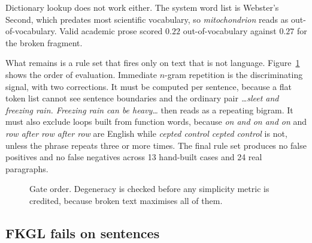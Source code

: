 \documentclass[twocolumn,10pt,a4paper]{article}
\begin{document}
Dictionary lookup does not work either. The system word list is Webster's Second,
which predates most scientific vocabulary, so \emph{mitochondrion} reads as
out-of-vocabulary. Valid academic prose scored $0.22$ out-of-vocabulary against
$0.27$ for the broken fragment.

What remains is a rule set that fires only on text that is not language.
Figure~\ref{fig:gate} shows the order of evaluation. Immediate $n$-gram
repetition is the discriminating signal, with two corrections. It must be
computed per sentence, because a flat token list cannot see sentence boundaries
and the ordinary pair \emph{\dots sleet and freezing rain. Freezing rain can be
heavy\dots} then reads as a repeating bigram. It must also exclude loops built
from function words, because \emph{on and on and on} and \emph{row after row
after row} are English while \emph{cepted control cepted control} is not, unless
the phrase repeats three or more times. The final rule set produces no false
positives and no false negatives across 13 hand-built cases and 24 real
paragraphs.

\begin{figure}[t]
\centering
{}
\caption{Gate order. Degeneracy is checked before any simplicity metric is
credited, because broken text maximises all of them.}
\label{fig:gate}
\end{figure}

\subsection{FKGL fails on sentences}
\end{document}
